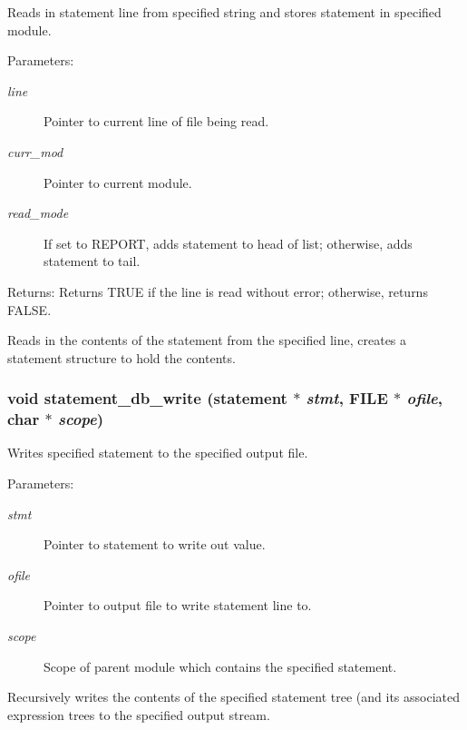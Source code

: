 Reads in statement line from specified string and stores statement in specified module. 

\begin{Desc}
\item[Parameters:]
\begin{description}
\item[{\em line}]Pointer to current line of file being read. \item[{\em curr\_\-mod}]Pointer to current module. \item[{\em read\_\-mode}]If set to REPORT, adds statement to head of list; otherwise, adds statement to tail.\end{description}
\end{Desc}
\begin{Desc}
\item[Returns:]Returns TRUE if the line is read without error; otherwise, returns FALSE.\end{Desc}
Reads in the contents of the statement from the specified line, creates a statement structure to hold the contents. 
\subsubsection{\setlength{\rightskip}{0pt plus 5cm}void statement\_\-db\_\-write ({\bf statement} $\ast$ {\em stmt}, FILE $\ast$ {\em ofile}, char $\ast$ {\em scope})}\label{statement_8h_a1}


Writes specified statement to the specified output file. 

\begin{Desc}
\item[Parameters:]
\begin{description}
\item[{\em stmt}]Pointer to statement to write out value. \item[{\em ofile}]Pointer to output file to write statement line to. \item[{\em scope}]Scope of parent module which contains the specified statement.\end{description}
\end{Desc}
Recursively writes the contents of the specified statement tree (and its associated expression trees to the specified output stream. 

